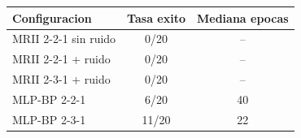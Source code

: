 \begin{tabular}{@{}lcc@{}}
\toprule
Configuracion & Tasa exito & Mediana epocas \\
\midrule
MRII 2-2-1 sin ruido & 0/20 & -- \\
MRII 2-2-1 + ruido & 0/20 & -- \\
MRII 2-3-1 + ruido & 0/20 & -- \\
MLP-BP 2-2-1 & 6/20 & 40 \\
MLP-BP 2-3-1 & 11/20 & 22 \\
\bottomrule
\end{tabular}
